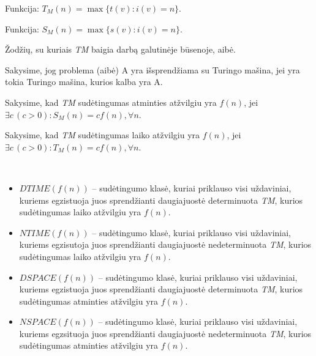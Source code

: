 \begin{defn}
  Funkcija: $T_{M} (n) = \max \{ t(v) : i(v) = n \}$.
\end{defn}

\begin{defn}
  Funkcija: $S_{M} (n) = \max \{ s(v) : i(v) = n \}$.
\end{defn}

\begin{defn}
  Žodžių, su kuriais \emph{TM} baigia darbą galutinėje būsenoje, aibė.
\end{defn}

\begin{defn}
  Sakysime, jog problema (aibė) A yra išsprendžiama su Turingo mašina,
  jei yra tokia Turingo mašina, kurios kalba yra A.
\end{defn}

Sakysime, kad \emph{TM} sudėtingumas atminties atžvilgiu yra 
$f(n)$, jei $\exists c \,(c >0) : S_{M}(n) = cf(n), \forall n$.

Sakysime, kad \emph{TM} sudėtingumas laiko atžvilgiu yra 
$f(n)$, jei $\exists c \,(c >0) : T_{M}(n) = cf(n), \forall n$.

\begin{defn}
  \hfill \\
  \begin{itemize}
    \item $DTIME(f(n))$ – sudėtingumo klasė, kuriai priklauso visi
      uždaviniai, kuriems egzistuoja juos sprendžianti daugiajuostė 
      determinuota \emph{TM}, kurios sudėtingumas laiko atžvilgiu 
      yra $f(n)$.
    \item $NTIME(f(n))$ – sudėtingumo klasė, kuriai priklauso visi
      uždaviniai, kuriems egzisutoja juos sprendžianti daugiajuostė 
      nedeterminuota \emph{TM}, kurios sudėtingumas laiko atžvilgiu
      yra $f(n)$.
    \item $DSPACE(f(n))$ – sudėtingumo klasė, kuriai priklauso visi
      uždaviniai, kuriems egzistuoja juos sprendžianti daugiajuostė
      determinuota \emph{TM}, kurios sudėtingumas atminties atžvilgiu
      yra $f(n)$.
    \item $NSPACE(f(n))$ – sudėtingumo klasė, kuriai priklauso visi
      uždaviniai, kuriems egzsituoja juos sprendžianti daugiajuostė
      nedeterminuota \emph{TM}, kurios sudėtingumas atminties atžvilgiu
      yra $f(n)$.
  \end{itemize}
\end{defn}

